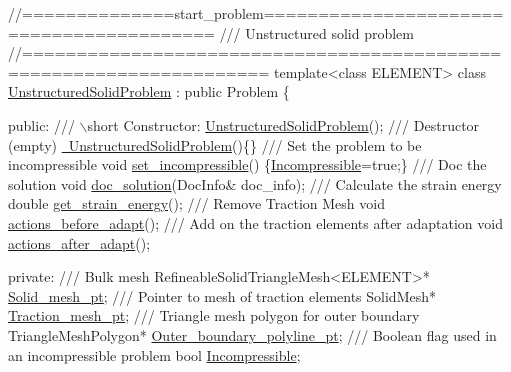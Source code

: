  
\begin{DoxyCodeInclude}
\textcolor{comment}{//==============start\_problem=========================================}
\textcolor{comment}{/// Unstructured solid problem}
\textcolor{comment}{}\textcolor{comment}{//====================================================================}
\textcolor{keyword}{template}<\textcolor{keyword}{class} ELEMENT> 
\textcolor{keyword}{class }\hyperlink{classUnstructuredSolidProblem}{UnstructuredSolidProblem} : \textcolor{keyword}{public} Problem
\{

\textcolor{keyword}{public}:
\textcolor{comment}{}
\textcolor{comment}{ /// \(\backslash\)short Constructor: }
\textcolor{comment}{} \hyperlink{classUnstructuredSolidProblem_a18ce02b6e4bbc86403c9e1b32c095772}{UnstructuredSolidProblem}();
\textcolor{comment}{}
\textcolor{comment}{ /// Destructor (empty)}
\textcolor{comment}{} \hyperlink{classUnstructuredSolidProblem_a25fe105d949498bf8f7c15aff96a7d00}{~UnstructuredSolidProblem}()\{\}
 \textcolor{comment}{}
\textcolor{comment}{ /// Set the problem to be incompressible}
\textcolor{comment}{} \textcolor{keywordtype}{void} \hyperlink{classUnstructuredSolidProblem_a9b725d83bc051b594d080a40d6d317d3}{set\_incompressible}() \{\hyperlink{classUnstructuredSolidProblem_a956386972054504cdc23fd970b126934}{Incompressible}=\textcolor{keyword}{true};\}
\textcolor{comment}{}
\textcolor{comment}{ /// Doc the solution}
\textcolor{comment}{} \textcolor{keywordtype}{void} \hyperlink{classUnstructuredSolidProblem_ab3d66fd61b69d12b4f159d763fc44f15}{doc\_solution}(DocInfo& doc\_info);
\textcolor{comment}{}
\textcolor{comment}{ /// Calculate the strain energy}
\textcolor{comment}{} \textcolor{keywordtype}{double} \hyperlink{classUnstructuredSolidProblem_a4da918a1f0cf94ebccc5112b58c28ece}{get\_strain\_energy}();
\textcolor{comment}{}
\textcolor{comment}{ /// Remove Traction Mesh}
\textcolor{comment}{} \textcolor{keywordtype}{void} \hyperlink{classUnstructuredSolidProblem_a463b4b976fdd12129ac2bd23bece1b8b}{actions\_before\_adapt}();
\textcolor{comment}{}
\textcolor{comment}{ /// Add on the traction elements after adaptation}
\textcolor{comment}{} \textcolor{keywordtype}{void} \hyperlink{classUnstructuredSolidProblem_acf0bbf57534a1516a633d702d9fd21ab}{actions\_after\_adapt}();

\textcolor{keyword}{private}:
 \textcolor{comment}{}
\textcolor{comment}{ /// Bulk mesh}
\textcolor{comment}{} RefineableSolidTriangleMesh<ELEMENT>* \hyperlink{classUnstructuredSolidProblem_af121067bd532a78b4360373b60aaddd0}{Solid\_mesh\_pt};
 \textcolor{comment}{}
\textcolor{comment}{ /// Pointer to mesh of traction elements}
\textcolor{comment}{} SolidMesh* \hyperlink{classUnstructuredSolidProblem_a42018e62ce6bf48968f389880669c8f4}{Traction\_mesh\_pt};
\textcolor{comment}{}
\textcolor{comment}{ /// Triangle mesh polygon for outer boundary }
\textcolor{comment}{} TriangleMeshPolygon* \hyperlink{classUnstructuredSolidProblem_a2e7ef7b4984d6d2a063c0c2374931d0c}{Outer\_boundary\_polyline\_pt}; 
\textcolor{comment}{}
\textcolor{comment}{ /// Boolean flag used in an incompressible problem}
\textcolor{comment}{} \textcolor{keywordtype}{bool} \hyperlink{classUnstructuredSolidProblem_a956386972054504cdc23fd970b126934}{Incompressible};


\end{DoxyCodeInclude}
